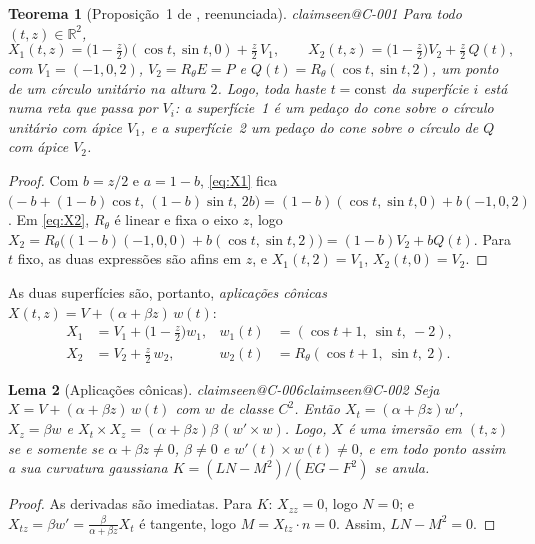 \documentclass[11pt,a4paper]{article}
\makeatletter
\theoremstyle{plain}
\newtheorem{theorem}{Teorema}[section]
\newtheorem{lemma}[theorem]{Lema}
\theoremstyle{remark}
\newcommand{\claim}[1]{\ifcsname claimseen@#1\endcsname\else\expandafter\gdef\csname claimseen@#1\endcsname{}\label{claim:#1}\fi}
\newcommand{\R}{\mathbb{R}}
\makeatother
\begin{document}
\begin{theorem}[Proposição~1 de \citealp{McKee2026}, reenunciada]\label{thm:cone}\claim{C-001}
Para todo $(t,z)\in\R^2$,
\[ X_1(t,z)=\big(1-\tfrac z2\big)(\cos t,\sin t,0)+\tfrac z2\, V_1,\qquad X_2(t,z)=\big(1-\tfrac z2\big)V_2+\tfrac z2\,Q(t), \]
com $V_1=(-1,0,2)$, $V_2=R_\theta E=P$ e $Q(t)=R_\theta(\cos t,\sin t,2)$, um ponto de um círculo unitário na altura $2$. Logo,
toda haste $t=\mathrm{const}$ da superfície $i$ está numa reta que passa por $V_i$: a superfície~1 é um pedaço do cone sobre o
círculo unitário com ápice $V_1$, e a superfície~2 um pedaço do cone sobre o círculo de $Q$ com ápice $V_2$.
\end{theorem}
\begin{proof}
Com $b=z/2$ e $a=1-b$, \eqref{eq:X1} fica $\big(-b+(1-b)\cos t,\,(1-b)\sin t,\,2b\big)=(1-b)(\cos t,\sin t,0)+b(-1,0,2)$. Em
\eqref{eq:X2}, $R_\theta$ é linear e fixa o eixo $z$, logo $X_2=R_\theta\big((1-b)(-1,0,0)+b(\cos t,\sin t,2)\big)
=(1-b)V_2+bQ(t)$. Para $t$ fixo, as duas expressões são afins em $z$, e $X_1(t,2)=V_1$, $X_2(t,0)=V_2$.
\end{proof}

As duas superfícies são, portanto, \emph{aplicações cônicas} $X(t,z)=V+(\alpha+\beta z)\,w(t)$:
\begin{equation}\label{eq:conemaps}
\begin{aligned}
X_1&=V_1+\big(1-\tfrac z2\big)w_1, & w_1(t)&=(\cos t+1,\ \sin t,\ -2),\\
X_2&=V_2+\tfrac z2\,w_2, & w_2(t)&=R_\theta(\cos t+1,\ \sin t,\ 2).
\end{aligned}
\end{equation}

\begin{lemma}[Aplicações cônicas]\label{lem:conemap}\claim{C-006}\claim{C-002}
Seja $X=V+(\alpha+\beta z)\,w(t)$ com $w$ de classe $C^2$. Então $X_t=(\alpha+\beta z)w'$, $X_z=\beta w$ e
$X_t\times X_z=(\alpha+\beta z)\beta\,(w'\times w)$. Logo, $X$ é uma imersão em $(t,z)$ se e somente se $\alpha+\beta z\ne0$,
$\beta\ne0$ e $w'(t)\times w(t)\ne0$, e em todo ponto assim a sua curvatura gaussiana $K=(LN-M^2)/(EG-F^2)$ se anula.
\end{lemma}
\begin{proof}
As derivadas são imediatas. Para $K$: $X_{zz}=0$, logo $N=0$; e $X_{tz}=\beta w'=\tfrac{\beta}{\alpha+\beta z}X_t$ é tangente,
logo $M=X_{tz}\cdot n=0$. Assim, $LN-M^2=0$.
\end{proof}
\end{document}
